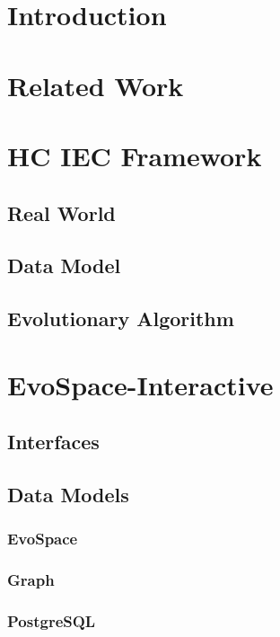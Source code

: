 \section{Introduction}

\section{Related Work}

\section{HC  IEC Framework}
  \subsection{Real World}
  \subsection{Data Model}
  \subsection{Evolutionary Algorithm}

\section{EvoSpace-Interactive}
  \subsection{Interfaces}
  \subsection{Data Models}
    \subsubsection{EvoSpace}
    \subsubsection{Graph}
    \subsubsection{PostgreSQL}
